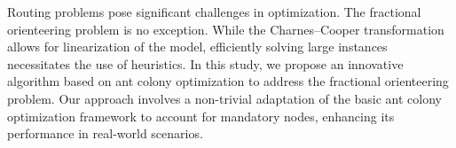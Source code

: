 
\begin{Abstrakt}
    Routing problems pose significant challenges in optimization. The fractional orienteering problem is no exception. While the Charnes–Cooper transformation allows for linearization of the model, efficiently solving large instances necessitates the use of heuristics. In this study, we propose an innovative algorithm based on ant colony optimization to address the fractional orienteering problem. Our approach involves a non-trivial adaptation of the basic ant colony optimization framework to account for mandatory nodes, enhancing its performance in real-world scenarios.
\end{Abstrakt}



\clearpage